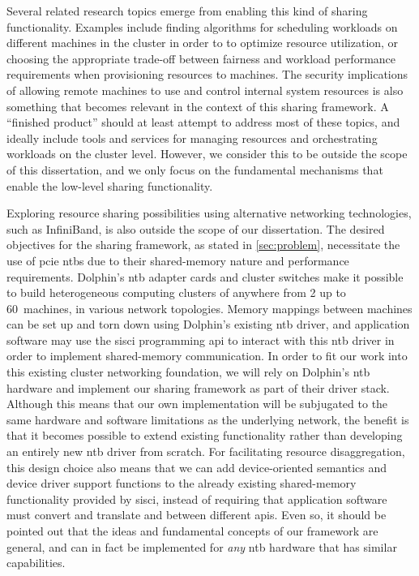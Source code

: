 Several related research topics emerge from enabling this kind of sharing functionality.
%
Examples include finding algorithms for scheduling workloads on different machines in the cluster in order to to optimize resource utilization, or choosing the appropriate trade-off between fairness and workload performance requirements when provisioning resources to machines.
%
The security implications of allowing remote machines to use and control internal system resources is also something that becomes relevant in the context of this sharing framework.
%
A ``finished product'' should at least attempt to address most of these topics, and ideally include tools and services for managing resources and orchestrating workloads on the cluster level.
%
However, we consider this to be outside the scope of this dissertation, and we only focus on the fundamental mechanisms that enable the low-level sharing functionality.



Exploring resource sharing possibilities using alternative networking technologies, such as InfiniBand, is also outside the scope of our dissertation.
%
The desired objectives for the sharing framework, as stated in \cref{sec:problem}, necessitate the use of \gls{pcie} \glspl{ntb} due to their shared-memory nature and performance requirements.
%
Dolphin's \gls{ntb} adapter cards and cluster switches make it possible to build heterogeneous computing clusters of anywhere from 2 up to 60~machines, in various network topologies.
%
Memory mappings between machines can be set up and torn down using Dolphin's existing \gls{ntb} driver, and application software may use the \gls{sisci} programming \gls{api} to interact with this \gls{ntb} driver in order to implement shared-memory communication.
%
In order to fit our work into this existing cluster networking foundation, we will rely on Dolphin's \gls{ntb} hardware and implement our sharing framework as part of their driver stack.
%
Although this means that our own implementation will be subjugated to the same hardware and software limitations as the underlying network, the benefit is that it becomes possible to extend existing functionality rather than developing an entirely new \gls{ntb} driver from scratch.
%
For facilitating resource \gls{disaggregation}, this design choice also means that we can add device-oriented semantics and device driver support functions to the already existing shared-memory functionality provided by \gls{sisci}, instead of requiring that application software must convert and translate and between different \glspl{api}.
%
Even so, it should be pointed out that the ideas and fundamental concepts of our framework are general, and can in fact be implemented for \emph{any} \gls{ntb} hardware that has similar capabilities.



